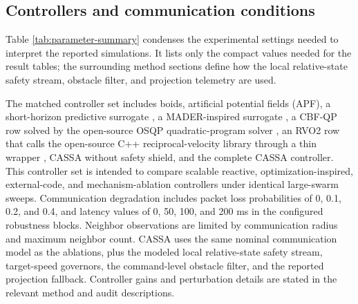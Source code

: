\documentclass[11pt]{article}
\begin{document}
\subsection{Controllers and communication conditions}

Table \ref{tab:parameter-summary} condenses the experimental settings needed to interpret the reported simulations. It lists only the compact values needed for the result tables; the surrounding method sections define how the local relative-state safety stream, obstacle filter, and projection telemetry are used.



The matched controller set includes boids, artificial potential fields (APF), a short-horizon predictive surrogate \cite{mun2026collision,dunbar2006distributed}, a MADER-inspired surrogate \cite{tordesillas2022mader}, a CBF-QP row solved by the open-source OSQP quadratic-program solver \cite{ames2017cbf,wang2017safety,stellato2020osqp}, an RVO2 row that calls the open-source C++ reciprocal-velocity library through a thin wrapper \cite{bareiss2015generalized,vandenberg2008rvo,snape2016rvo2}, CASSA without safety shield, and the complete CASSA controller. This controller set is intended to compare scalable reactive, optimization-inspired, external-code, and mechanism-ablation controllers under identical large-swarm sweeps. Communication degradation includes packet loss probabilities of 0, 0.1, 0.2, and 0.4, and latency values of 0, 50, 100, and 200 ms in the configured robustness blocks. Neighbor observations are limited by communication radius and maximum neighbor count. CASSA uses the same nominal communication model as the ablations, plus the modeled local relative-state safety stream, target-speed governors, the command-level obstacle filter, and the reported projection fallback. Controller gains and perturbation details are stated in the relevant method and audit descriptions.
\end{document}
